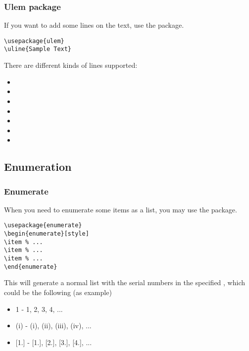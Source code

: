 \begin{frame}[fragile]
    \frametitle{Ulem package}
    If you want to add some lines on the text, use the  package.
    \begin{command}
        \begin{verbatim}
\usepackage{ulem}
\uline{Sample Text}
		\end{verbatim}
    \end{command}
    \pause
    There are different kinds of lines supported:
    \begin{itemize}
        \item {}
        \item {}
        \item {}
        \item {}
        \item {}
        \item {}
        \item {}
    \end{itemize}
\end{frame}

\subsection{Enumeration}
\begin{frame}[fragile]
    \frametitle{Enumerate}
    When you need to enumerate some items as a list, you may use the  package.
    \begin{command}
        \begin{verbatim}
\usepackage{enumerate}
\begin{enumerate}[style]
\item % ...
\item % ...
\item % ...
\end{enumerate}
		\end{verbatim}
    \end{command}
    \pause
    This will generate a normal list with the serial numbers in the specified , which could be the following (as example)
    \begin{itemize}
        \item \alert{1} - 1, 2, 3, 4, ...
        \item \alert{(i)} - (i), (ii), (iii), (iv), ...
        \item \alert{[1.]} - [1.], [2.], [3.], [4.], ...
    \end{itemize}
\end{frame}

